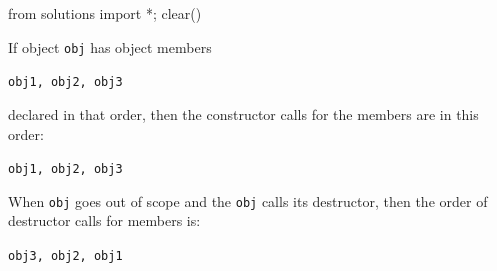 \begin{python0}
from solutions import *; clear()
\end{python0}

If object \texttt{obj} has object members
\begin{center}
\texttt{obj1, obj2, obj3}
\end{center}
declared in that order, then the constructor calls for the members are
in this order:
\begin{center}
\texttt{obj1, obj2, obj3 }
\end{center}
When \texttt{obj} goes out of scope and the \texttt{obj} calls its
destructor, then the order of destructor calls for members is:
\begin{center}
\texttt{obj3, obj2, obj1}
\end{center}
